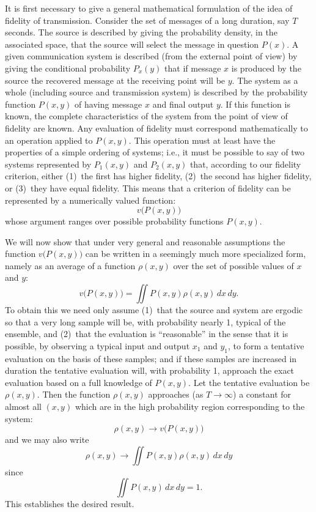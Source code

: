 It is first necessary to give a general mathematical formulation of the
idea of fidelity of transmission.  Consider the set of messages of a long
duration, say $T$ seconds.  The source is described by giving the
probability density, in the associated
space, that the source will select the message in question $P(x)$.  A given
communication system is described
(from the external point of view) by giving the conditional probability
$P_x(y)$ that if message $x$ is produced by the source the recovered
message at the receiving point will be $y$.  The system as a whole
(including source and transmission system) is described by the
probability function $P(x,y)$ of having message $x$ and final output $y$.
If this function is known, the complete characteristics of the system from
the point of view of fidelity are known.  Any evaluation of fidelity must
correspond mathematically to an operation applied to $P(x,y)$.  This
operation must at least have the properties of a simple ordering of
systems; i.e., it must be possible to say of two systems represented by
$P_1(x,y)$ and $P_2(x,y)$ that, according to our fidelity criterion, either
(1)~the first has higher fidelity, (2)~the second has higher fidelity, or
(3)~they have equal fidelity.  This means that a criterion of fidelity can
be represented by a numerically valued function:
$$
v\bigl(P(x,y)\bigr)
$$
whose argument ranges over possible probability functions $P(x,y)$.

We will now show that under very general and reasonable assumptions the
function $v\bigl(P(x,y)\bigr)$ can be written in a seemingly much more
specialized form, namely as an average of a function $\rho(x,y)$ over the
set of possible values of $x$ and $y$:
$$
v\bigl(P(x,y)\bigr)=\iint P(x,y)\rho(x,y)\,dx\,dy.
$$
To obtain this we need only assume (1)~that the source and system are
ergodic so that a very long sample will be, with probability nearly 1,
typical of the ensemble, and (2)~that the evaluation is ``reasonable'' in
the sense that it is possible, by observing a typical input and output $x_1$
and $y_1$, to form a tentative evaluation on the basis of these samples; and
if these samples are increased in duration the tentative evaluation will, with
probability 1, approach the exact evaluation based on a full knowledge of
$P(x,y)$.  Let the tentative evaluation be $\rho(x,y)$.  Then the function
$\rho(x,y)$ approaches (as $T\to\infty$) a constant for almost all $(x,y)$
which are in the high probability region corresponding to the system:
$$
\rho(x,y)\to v\bigl(P(x,y)\bigr)
$$
and we may also write
$$
\rho(x,y)\to\iint P(x,y)\rho(x,y)\,dx\,dy
$$
since
$$
\iint P(x,y)\,dx\,dy=1.
$$
This establishes the desired result.

